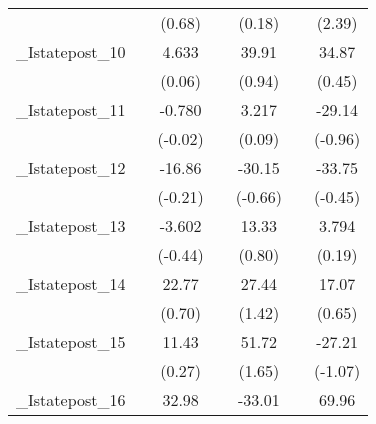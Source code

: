 {\begin{tabular}{l*{6}{c}}
            &                     &      (0.68)         &                     &      (0.18)         &                     &      (2.39)         \\
[1em]
\_Istatepost\_10&                     &       4.633         &                     &       39.91         &                     &       34.87         \\
            &                     &      (0.06)         &                     &      (0.94)         &                     &      (0.45)         \\
[1em]
\_Istatepost\_11&                     &      -0.780         &                     &       3.217         &                     &      -29.14         \\
            &                     &     (-0.02)         &                     &      (0.09)         &                     &     (-0.96)         \\
[1em]
\_Istatepost\_12&                     &      -16.86         &                     &      -30.15         &                     &      -33.75         \\
            &                     &     (-0.21)         &                     &     (-0.66)         &                     &     (-0.45)         \\
[1em]
\_Istatepost\_13&                     &      -3.602         &                     &       13.33         &                     &       3.794         \\
            &                     &     (-0.44)         &                     &      (0.80)         &                     &      (0.19)         \\
[1em]
\_Istatepost\_14&                     &       22.77         &                     &       27.44         &                     &       17.07         \\
            &                     &      (0.70)         &                     &      (1.42)         &                     &      (0.65)         \\
[1em]
\_Istatepost\_15&                     &       11.43         &                     &       51.72         &                     &      -27.21         \\
            &                     &      (0.27)         &                     &      (1.65)         &                     &     (-1.07)         \\
[1em]
\_Istatepost\_16&                     &       32.98         &                     &      -33.01         &                     &       69.96         \\

\end{tabular}}
